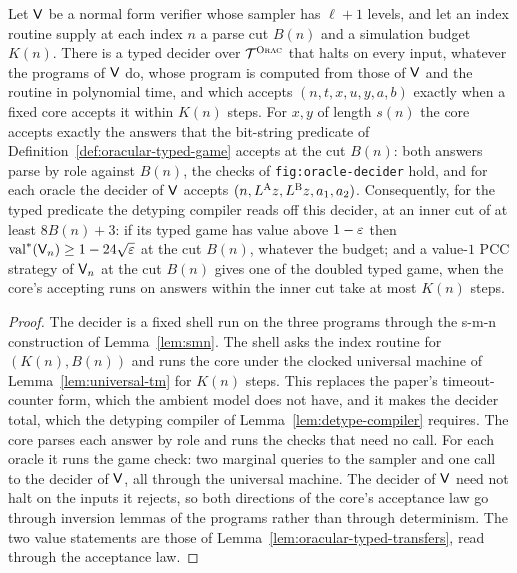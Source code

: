 \begin{lemma}
\label{lem:oracle-typed-decider}
\leanok
Let $\mathsf{V}$ be a normal form verifier whose sampler has $\ell + 1$ levels, and let an index
routine supply at each index $n$ a parse cut $B(n)$ and a simulation budget $K(n)$. There is a
typed decider over $\mathcal{T}^{\textsc{Orac}}$ that halts on every input, whatever the programs of $\mathsf{V}$
do, whose program is computed from those of $\mathsf{V}$ and the routine in polynomial time, and
which accepts $(n, t, x, u, y, a, b)$ exactly when a fixed core accepts it within $K(n)$ steps.
For $x, y$ of length $s(n)$ the core accepts exactly the answers that the bit-string predicate of
Definition~\ref{def:oracular-typed-game} accepts at the cut $B(n)$: both answers parse by role
against $B(n)$, the checks of \texttt{fig:oracle-decider} hold, and for each oracle the decider of
$\mathsf{V}$ accepts $(n, L^{\textsc{A}} z, L^{\textsc{B}} z, a_1, a_2)$. Consequently, for the typed predicate
the detyping compiler reads off this decider, at an inner cut of at least $8B(n) + 3$: if its
typed game has value above $1 - \varepsilon$ then $\mathrm{val}^*(\mathsf{V}_n) \geq 1 - 24\sqrt{\varepsilon}$ at the
cut $B(n)$, whatever the budget; and a value-$1$ PCC strategy of $\mathsf{V}_n$ at the cut $B(n)$
gives one of the doubled typed game, when the core's accepting runs on answers within the inner
cut take at most $K(n)$ steps.
\end{lemma}
\begin{proof}
\leanok
The decider is a fixed shell run on the three programs through the s-m-n construction of
Lemma~\ref{lem:smn}. The shell asks the index routine for $(K(n), B(n))$ and runs the core under
the clocked universal machine of Lemma~\ref{lem:universal-tm} for $K(n)$ steps. This replaces the
paper's timeout-counter form, which the ambient model does not have, and it makes the decider
total, which the detyping compiler of Lemma~\ref{lem:detype-compiler} requires. The core parses
each answer by role and runs the checks that need no call. For each oracle it runs the game
check: two marginal queries to the sampler and one call to the decider of $\mathsf{V}$, all
through the universal machine. The decider of $\mathsf{V}$ need not halt on the inputs it
rejects, so both directions of the core's acceptance law go through inversion lemmas of the
programs rather than through determinism. The two value statements are those of
Lemma~\ref{lem:oracular-typed-transfers}, read through the acceptance law.
\end{proof}

